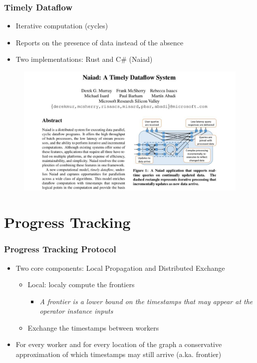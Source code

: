 \documentclass{beamer}
\begin{document}
\begin{frame}
  \frametitle{Timely Dataflow}
  \begin{itemize}
    \item Iterative computation (cycles)
          \pause
    \item Reports on the presence of data instead of the absence
          \pause
    \item Two implementations: Rust and C\# (Naiad)
  \end{itemize}
  \pause
  \begin{figure}
    \includegraphics[width=\textwidth]{naiad.jpg}
  \end{figure}
\end{frame}

\section{Progress Tracking}

\begin{frame}
  \frametitle{Progress Tracking Protocol}
  \begin{itemize}
    \item Two core components: Local Propagation and Distributed Exchange
          \begin{itemize}
            \item Local: localy compute the frontiers
                  \begin{itemize}
                    \item \textit{A frontier is a lower bound on the timestamps that may appear at the operator instance inputs}
                  \end{itemize}
            \item Exchange the timestamps between workers
          \end{itemize}
          \pause
    \item For every worker and for every location of the graph a conservative approximation of which timestamps may still arrive (a.ka. frontier)
  \end{itemize}
\end{frame}
\end{document}
